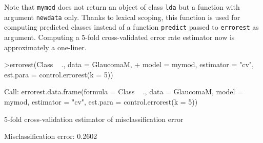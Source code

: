 \documentclass[11pt]{article}
\begin{document}
Note that \texttt{mymod} does not return 
an object of class \texttt{lda} but a function
with argument \texttt{newdata} only. Thanks to lexical scoping, this 
function is used for computing
predicted classes instead of a function \texttt{predict} passed to
\texttt{errorest} as argument. Computing a $5$-fold cross-validated error rate
estimator now is approximately a one-liner.

\begin{Schunk}
\begin{Sinput}
>errorest(Class ~ ., data = GlaucomaM, 
+     model = mymod, estimator = "cv", est.para = control.errorest(k = 5))
\end{Sinput}
\begin{Soutput}
Call:
errorest.data.frame(formula = Class ~ ., data = GlaucomaM, model = mymod, 
    estimator = "cv", est.para = control.errorest(k = 5))

	 5-fold cross-validation estimator of misclassification error 

Misclassification error:  0.2602 
\end{Soutput}
\end{Schunk}


\end{document}
